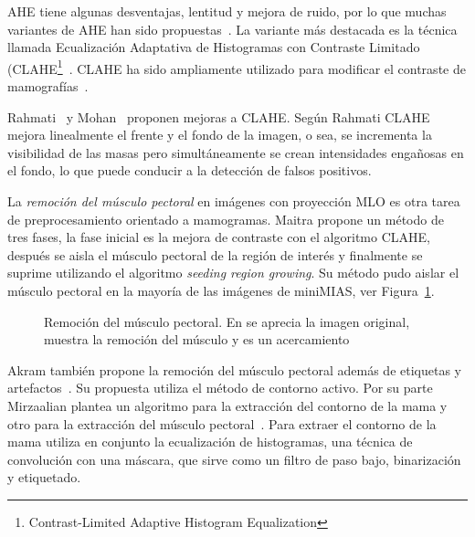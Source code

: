 AHE tiene algunas desventajas, lentitud y mejora de ruido, por lo que muchas
variantes de AHE han sido propuestas~\cite{pizer1987adaptive}. La variante más
destacada es la técnica llamada Ecualización Adaptativa de Histogramas con
Contraste Limitado (CLAHE\footnote{Contrast-Limited Adaptive Histogram
Equalization}~\cite{zuiderveld1994contrast}. CLAHE ha sido ampliamente
utilizado para modificar el contraste de mamografías~\cite{pisano1998contrast,
maitra2012technique}.

Rahmati~\cite{rahmati2010new} y Mohan~\cite{mohan2013modified} proponen mejoras
a CLAHE. Según Rahmati CLAHE mejora linealmente el frente y el fondo de la
imagen, o sea, se incrementa la visibilidad de las masas pero simultáneamente
se crean intensidades engañosas en el fondo, lo que puede conducir a la
detección de falsos positivos.

La \textit{remoción del músculo pectoral} en imágenes con proyección MLO es
otra tarea de preprocesamiento orientado a mamogramas. Maitra propone un método
de tres fases, la fase inicial es la mejora de contraste con el algoritmo
CLAHE, después se aisla el músculo pectoral de la región de interés y
finalmente se suprime utilizando el algoritmo \textit{seeding region growing}.
Su método pudo aislar el músculo pectoral en la mayoría de las imágenes de
miniMIAS, ver Figura~\ref{fig:muscle}.

\begin{figure}[h]
    \centering
    \hspace{1cm}
    \hspace{1cm}
  \caption[Remoción del músculo pectoral]
  {Remoción del músculo pectoral. En \protect{} se aprecia la 
  imagen original, \protect{} muestra la remoción del músculo y 
  \protect{} es un acercamiento}
  \label{fig:muscle}
\end{figure}

Akram también propone la remoción del músculo pectoral además de etiquetas y
artefactos~\cite{akram2013preprocessing}. Su propuesta utiliza el método de
contorno activo. Por su parte Mirzaalian plantea un algoritmo para la
extracción del contorno de la mama y otro para la extracción del músculo
pectoral~\cite{mirzaalian2007pre}. Para extraer el contorno de la mama utiliza
en conjunto la ecualización de histogramas, una técnica de convolución con una
máscara, que sirve como un filtro de paso bajo, binarización y etiquetado.

